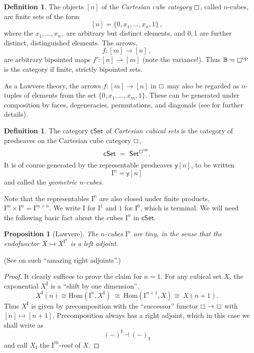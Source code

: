 \documentclass[11pt,reqno]{amsart}
\newcommand{\C}{\ensuremath{\boxempty}}
\newcommand{\B}{\ensuremath{\mathbb{B}}}
\newcommand{\psh}[1]{\ensuremath{\mathsf{Set}^{#1^{\mathrm{op}}}}}
\newcommand{\cSet}{\ensuremath{\mathsf{cSet}}}
\newcommand{\y}{\ensuremath{\mathsf{y}}} %
\newcommand{\op}[1]{\ensuremath{{#1}^{\mathrm{op}}}}
\newcommand{\ra}{\ensuremath{\rightarrow}}
\renewcommand{\to}{\ensuremath{\rightarrow}}
\renewcommand{\hom}{\ensuremath{\mathrm{Hom}}}
\newcommand{\I}{\ensuremath{\mathrm{I}}}
\newtheorem{proposition}[theorem]{Proposition}
\theoremstyle{remark}
\theoremstyle{definition}
\newtheorem{definition}[theorem]{Definition}
\begin{document}
\begin{definition}
The objects $[n]$ of the \emph{Cartesian cube category} $\C$, called $n$-cubes, are finite sets of the form 
\[
[n] = \{0, x_1, ..., x_n, 1\}\,,
\]
 where the $x_1, ..., x_n,$ are arbitrary but distinct elements, and $0,1$ are further distinct, distinguished elements.
The arrows,
\[
f : [m] \ra [n]\,,
\]
are arbitrary bipointed maps $f' : [n]\ra [m]$ (note the variance!).  Thus $\B = \op\C$ is the category if finite, strictly bipointed sets.  
\end{definition}
As a Lawvere theory, the arrows $f : [m] \ra [n]$ in $\C$ may also be regarded as $n$-tuples of elements from the set $\{0, x_1, ..., x_m, 1\}$.   These can be generated under composition by faces, degeneracies, permutations, and diagonals (see \cite{parker:thesis} for further details).

\begin{definition}\label{def:cSet}
The category \cSet\ of \emph{Cartesian cubical sets} is the category of presheaves on the Cartesian cube category $\C$,
\[
\mathsf{cSet}\ =\ \psh{\C}.
\]
It is of course generated by the representable presheaves $\y{[n]}$, to be written \[
\I^n = \y{[n]}
\]
 and called the \emph{geometric $n$-cubes}.   
\end{definition}

Note that the representables $\I^n$ are also closed under finite products, $\I^m \times \I^n = \I^{m+n}$.  We write $\I$ for $\I^1$ and $1$ for $\I^0$, which is terminal.  We will need the following basic fact about the cubes $\I^n$ in $\cSet$.

\begin{proposition}[Lawvere]\label{prop:Itiny}
The $n$-cubes $\I^n$ are \emph{tiny}, in the sense that the endofunctor $X\mapsto X^{\I^n}$ is a left adjoint.
\end{proposition}
\noindent (See \cite{Lawvere:2004} on such ``amazing right adjoints''.)

\begin{proof}
It clearly suffices to prove the claim for $n=1$.   For any cubical set $X$, the exponential $X^\I$ is a ``shift by one dimension'', 
\begin{equation}\label{eq:pathsisshift}
X^\I(n) \cong \hom(\I^n, X^\I)\ \cong\  \hom(\I^{n+1}, X)\cong\ X(n+1).
\end{equation}
Thus $X^\I$ is given by precomposition with the ``successor'' functor $\C\to\C$ with $[n] \mapsto [n+1]$. Precomposition always has a right adjoint, which in this case we shall write as 
\[
(-)^\I\dashv (-)_\I 
\]
 and call $X_\I$ the $\I^{th}$-\emph{root} of $X$.
\end{proof}
\end{document}
